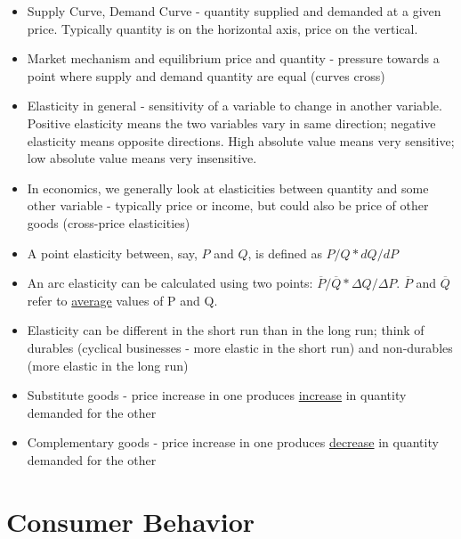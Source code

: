 \documentclass{exam}
\begin{document}
\begin{itemize}
  \item Supply Curve, Demand Curve - quantity supplied and demanded at a given price.  Typically quantity is on the horizontal axis, price on the vertical.
  \item Market mechanism and equilibrium price and quantity - pressure towards a point where supply and demand quantity are equal (curves cross)
  \item Elasticity in general - sensitivity of a variable to change in another variable. Positive elasticity means the two variables vary in same direction; negative elasticity means opposite directions.  High absolute value means very sensitive; low absolute value means very insensitive.
  \item In economics, we generally look at elasticities between quantity and some other variable - typically price or income, but could also be price of other goods (cross-price elasticities)
  \item A point elasticity between, say, $P$ and $Q$, is defined as $P/Q*dQ/dP$
  \item An arc elasticity can be calculated using two points:  $\overline{P}/\overline{Q}*\Delta Q / \Delta P$.  $\overline{P}$ and $\overline{Q}$ refer to \underline{average} values of P and Q.
  \item Elasticity can be different in the short run than in the long run; think of durables (cyclical businesses - more elastic in the short run) and non-durables (more elastic in the long run)
  \item Substitute goods - price increase in one produces \underline{increase} in quantity demanded for the other
  \item Complementary goods - price increase in one produces \underline{decrease} in quantity demanded for the other
\end{itemize}

\section{Consumer Behavior}
\end{document}
